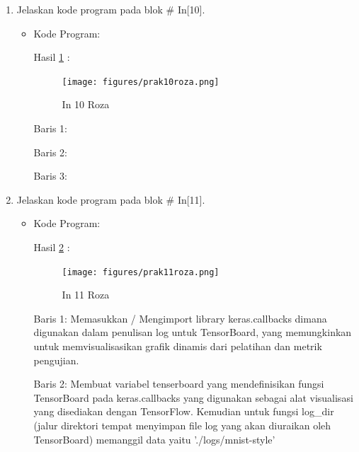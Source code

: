 \begin{enumerate}
\item Jelaskan kode program pada blok \# In[10].
\begin{itemize}
\item Kode Program:

\par Hasil \ref{in10roza} :
\begin{figure}[!hbtp]
\centering
\texttt{[image: figures/prak10roza.png]}
\caption{In 10 Roza}
\label{in10roza}
\end{figure}
\par Baris 1: 
\par Baris 2:
\par Baris 3:
\end{itemize}
\par

\item Jelaskan kode program pada blok \# In[11].
\begin{itemize}
\item Kode Program:

\par Hasil \ref{in11roza} :
\begin{figure}[!hbtp]
\centering
\texttt{[image: figures/prak11roza.png]}
\caption{In 11 Roza}
\label{in11roza}
\end{figure}
\par Baris 1: Memasukkan / Mengimport library keras.callbacks dimana digunakan dalam penulisan log untuk TensorBoard, yang memungkinkan untuk memvisualisasikan grafik dinamis dari pelatihan dan metrik pengujian.
\par Baris 2: Membuat variabel tenserboard yang mendefinisikan fungsi TensorBoard pada keras.callbacks yang digunakan sebagai alat visualisasi yang disediakan dengan TensorFlow. Kemudian untuk fungsi log\_dir (jalur direktori tempat menyimpan file log yang akan diuraikan oleh TensorBoard) memanggil data yaitu './logs/mnist-style'
\end{itemize}
\par


\end{enumerate}

